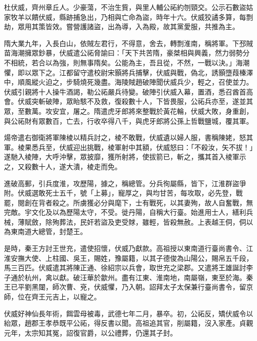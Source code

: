 
\begin{pinyinscope}

 杜伏威，齊州章丘人。少豪蕩，不治生貲，與里人輔公祏約刎頸交。公示石數盜姑家牧羊以饋伏威，縣跡捕急出，乃相與亡命為盜，時年十六。伏威狡譎多算，每剽劫，眾用其策皆效。嘗營護諸盜，出為導，入為殿，故其黨愛服，共推為主。



 隋大業九年，入長白山，依賊左君行，不得意，舍去，轉剽淮南，稱將軍。下邳賊苗海潮擁眾鈔暴，伏威遣公祏脅諭曰：「天下共苦隋，豪桀相與興義，然力弱勢分不相統，若合以為強，則無事隋矣。公能為主，吾且從，不然，一戰以決。」海潮懼，即以眾下之。江都留守遣校尉宋顥將兵捕擊，伏威與戰，偽北，誘顥墮葭榛澤中，順風縱火迫之，步騎燒死幾盡。海陵賊趙破陣聞伏威兵少，輕之，召使並力。伏威引親將十人操牛酒謁，勒公祏嚴兵待變。破陣引伏威入幕，置酒，悉召酋首高會。伏威突斬破陣，眾眙駭不及救，復殺數十人，下皆畏服，公祏兵亦至，遂並其眾，至數萬。攻安宜，屠之。隋遣虎牙郎將來整戰於黃花輪，伏威大敗，身重創，與公祏財有眾數百，亡去，行收卒得八千，與虎牙郎將公孫上哲戰鹽城，覆其軍。



 煬帝遣右御衛將軍陳棱以精兵討之，棱不敢戰，伏威遺以婦人服，書稱陳姥，怒其軍。棱果悉兵至，伏威迎出挑戰，棱軍射中其額，伏威怒曰：「不殺汝，矢不拔！」遂馳入棱陣，大呼沖擊，眾披靡，獲所射將，使拔箭已，斬之，攜其首入棱軍示之，又殺數十人，遂大潰，棱走而免。



 進破高郵，引兵度淮，攻歷陽，據之，稱總管。分兵徇屬縣，皆下，江淮群盜爭附。伏威選敢死士五千，號「上募」，寵厚之，與均甘苦，每攻取，必先登，戰罷，閱創在背者殺之。所虜獲必分與麾下，士有戰死，以其妻殉，故人自奮戰，無完敵。宇文化及以為歷陽太守，不受。徙丹陽，自稱大行臺。始進用士人，繕利兵械，薄賦斂，除殉葬法，民奸若盜及吏受賕，雖輕，皆殺無赦。上表越王侗，侗以為東南道大總管，封楚王。



 是時，秦王方討王世充，遣使招懷，伏威乃獻款。高祖授以東南道行臺尚書令、江淮安撫大使、上柱國、吳王，賜姓，豫屬籍，以其子德俊為山陽公，賜帛五千段，馬三百匹。伏威遣其將陳正通、徐紹宗以兵會，取世充之梁郡。又遣將王雄誕討李子通於杭州，禽以獻。破汪華於歙州。盡有江東、淮南地，南屬嶺，東至於海。秦王已平劉黑闥，師次曹、兗，伏威懼，乃入朝。詔拜太子太保兼行臺尚書令，留京師，位在齊王元吉上，以寵之。



 伏威好神仙長年術，餌雲母被毒，武德七年二月，暴卒。初，公祏反，矯伏威令以紿眾，趙郡王孝恭既平公祏，得反書以聞。高祖追其官，削屬籍，沒入家產。貞觀元年，太宗知其冤，詔復官爵，以公禮葬，仍還其子封。




\end{pinyinscope}
